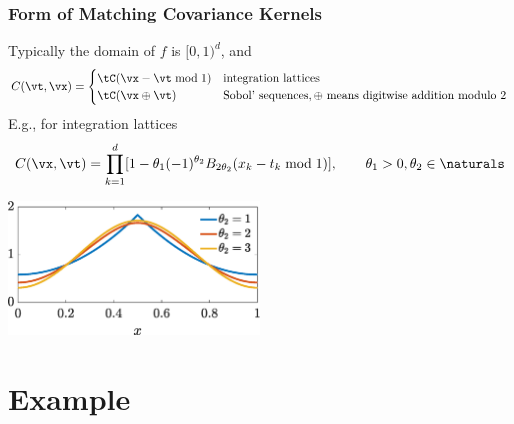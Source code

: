 \documentclass[10pt,compress,xcolor={usenames,dvipsnames},aspectratio=169]{beamer} %
\begin{document}
\begin{frame}
\frametitle{Form of Matching Covariance Kernels}
\vspace{-4ex}
Typically the domain of $f$ is $[0,1)^d$, and 
\begin{equation*}
C(\vt,\vx)  = \begin{cases}
\tC(\vx - \vt \bmod 1) & \text{integration lattices} \\
\tC(\vx \oplus \vt) & \text{Sobol' sequences},  \oplus \text{ means digitwise addition modulo } 2
\end{cases}
\end{equation*}
E.g., for integration lattices
\[
C(\vx,\vt) = \prod_{k=1}^d [1 - \theta_1 (-1)^{\theta_2}B_{2\theta_2}(x_k-t_k \bmod 1)], \qquad \theta_1 > 0,  \theta_2 \in \naturals
\]
\centerline{\includegraphics[width=0.5\textwidth]{Programs/BernoulliKernel.eps}}

\end{frame}


\section{Example}
\end{document}
